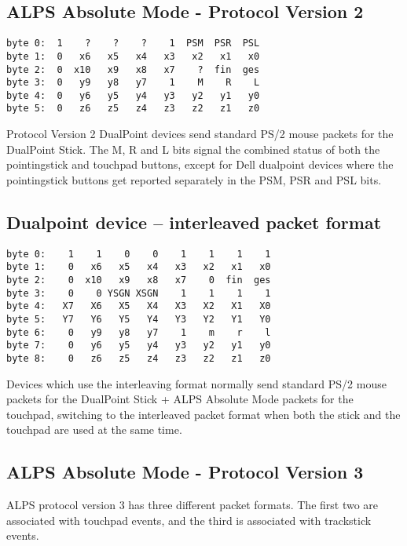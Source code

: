 \documentclass[a4paper,8pt,english]{sphinxmanual}
\begin{document}
\subsection{ALPS Absolute Mode - Protocol Version 2}
\label{input/devices/alps:alps-absolute-mode-protocol-version-2}
\begin{Verbatim}[commandchars=\\\{\}]
byte 0:  1    ?    ?    ?    1  PSM  PSR  PSL
byte 1:  0   x6   x5   x4   x3   x2   x1   x0
byte 2:  0  x10   x9   x8   x7    ?  fin  ges
byte 3:  0   y9   y8   y7    1    M    R    L
byte 4:  0   y6   y5   y4   y3   y2   y1   y0
byte 5:  0   z6   z5   z4   z3   z2   z1   z0
\end{Verbatim}

Protocol Version 2 DualPoint devices send standard PS/2 mouse packets for
the DualPoint Stick. The M, R and L bits signal the combined status of both
the pointingstick and touchpad buttons, except for Dell dualpoint devices
where the pointingstick buttons get reported separately in the PSM, PSR
and PSL bits.


\subsection{Dualpoint device -- interleaved packet format}
\label{input/devices/alps:dualpoint-device-interleaved-packet-format}
\begin{Verbatim}[commandchars=\\\{\}]
byte 0:    1    1    0    0    1    1    1    1
byte 1:    0   x6   x5   x4   x3   x2   x1   x0
byte 2:    0  x10   x9   x8   x7    0  fin  ges
byte 3:    0    0 YSGN XSGN    1    1    1    1
byte 4:   X7   X6   X5   X4   X3   X2   X1   X0
byte 5:   Y7   Y6   Y5   Y4   Y3   Y2   Y1   Y0
byte 6:    0   y9   y8   y7    1    m    r    l
byte 7:    0   y6   y5   y4   y3   y2   y1   y0
byte 8:    0   z6   z5   z4   z3   z2   z1   z0
\end{Verbatim}

Devices which use the interleaving format normally send standard PS/2 mouse
packets for the DualPoint Stick + ALPS Absolute Mode packets for the
touchpad, switching to the interleaved packet format when both the stick and
the touchpad are used at the same time.


\subsection{ALPS Absolute Mode - Protocol Version 3}
\label{input/devices/alps:alps-absolute-mode-protocol-version-3}
ALPS protocol version 3 has three different packet formats. The first two are
associated with touchpad events, and the third is associated with trackstick
events.
\end{document}
